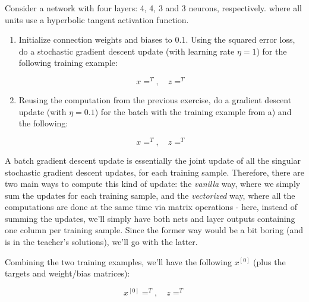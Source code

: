 \documentclass[12pt]{article}
\begin{document}
\begin{enumerate}[leftmargin=\labelsep]
  \begin{tcolorbox}[enhanced jigsaw,colback=bg,boxrule=0pt,arc=1pt]
    \item Consider a network with four layers: 4, 4, 3 and 3 neurons, respectively.
    where all units use a hyperbolic tangent activation function.

    \begin{enumerate}
      \item {Initialize connection weights and biases to 0.1. Using the squared
            error loss, do a stochastic gradient descent update (with learning rate $\eta = 1$)
            for the following training example:

            \begin{equation*}
              x = ^T, \quad z = ^T
            \end{equation*}} \label{ex-2-a}

      \item {Reusing the computation from the previous exercise, do a gradient descent update
            (with $\eta = 0.1$) for the batch with the training example from a) and the following:

            \begin{equation*}
              x = ^T, \quad z = ^T
            \end{equation*}} \label{ex-2-b}
    \end{enumerate}
  \end{tcolorbox}

  A batch gradient descent update is essentially the joint update of all the
  singular stochastic gradient descent updates, for each training sample.
  Therefore, there are two main ways to compute this kind of update:
  the \textit{vanilla} way, where we simply sum the updates for each training
  sample, and the \textit{vectorized} way, where all the computations are done
  at the same time via matrix operations - here, instead of summing the updates,
  we'll simply have both nets and layer outputs containing one column per
  training sample. Since the former way would be a bit boring (and is in the
  teacher's solutions), we'll go with the latter.

  Combining the two training examples, we'll have the following $x^{[0]}$ (plus
  the targets and weight/bias matrices):

  \begin{equation*}
    x^{[0]} = ^T, \quad z = ^T
  \end{equation*}


\end{enumerate}
\end{document}

